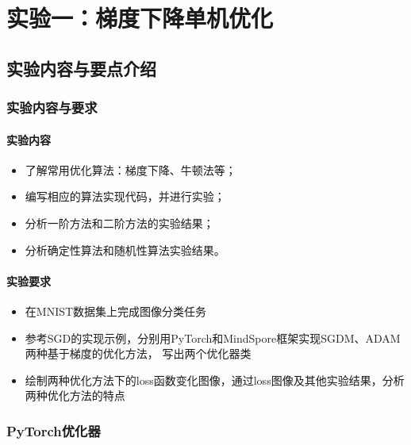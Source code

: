 \chapter{实验一：梯度下降单机优化}\label{chapter:task1}

\section{实验内容与要点介绍}

\subsection{实验内容与要求}

\subsubsection{实验内容}
\begin{itemize}
    \item 了解常用优化算法：梯度下降、牛顿法等；
    \item 编写相应的算法实现代码，并进行实验；
    \item 分析一阶方法和二阶方法的实验结果；
    \item 分析确定性算法和随机性算法实验结果。
\end{itemize}

\subsubsection{实验要求}
\begin{itemize}
    \item 在MNIST数据集上完成图像分类任务
    \item 参考SGD的实现示例，分别用PyTorch和MindSpore框架实现SGDM、ADAM两种基于梯度的优化方法， 写出两个优化器类
    \item 绘制两种优化方法下的loss函数变化图像，通过loss图像及其他实验结果，分析两种优化方法的特点
\end{itemize}

\subsection{PyTorch优化器}

